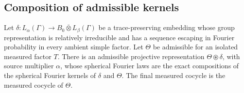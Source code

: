 \subsection{Composition of admissible kernels}

\begin{lemma}\label{lem:scale-insertion}
Let
\(\delta:L_\alpha(\Gamma)\to B_0\bar\otimes L_\beta(\Gamma)\)
be a trace-preserving embedding whose group representation is
relatively irreducible and has a sequence escaping in Fourier
probability in every ambient simple factor.  Let \(\Theta\)
be admissible for an isolated measured factor \(T\).
There is an admissible projective representation
\(\Theta\circledast\delta\), with source multiplier \(\alpha\),
whose spherical Fourier laws are the exact compositions of
the spherical Fourier kernels of \(\delta\) and \(\Theta\).
The final measured cocycle is the measured cocycle of \(\Theta\).
\end{lemma}

